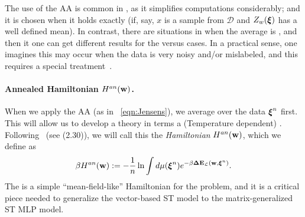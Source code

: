 The use of the AA is common in \STATMECH, as it simplifies computations considerably; and 
it is chosen when it holds exactly (if, say, $x$ is a \Typical sample from $\mathcal{D}$ and $Z_w(\boldsymbol{\xi})$ has a well defined mean).
In contrast, there are situations in \STATMECH when the average is \ATypical, and then it one can get different results for the \Quenched versus \Annealed cases.  In a practical sense, one imagines this may occur when the data is very
noisy and/or mislabeled, and this requires a special treatment~\cite{SST92}.

\paragraph{Annealed Hamiltonian $H^{an}({\mathbf{w}})$.}

When we apply the AA (as in \EQN~\ref{eqn:Jensens}), 
we average over the data $\boldsymbol{\xi}^{n}$ first. 
This will allow us to develop a theory in terms a (Temperature dependent) \EffectivePotential. 
%
Following~\cite{SST92} (see \EQN(2.30)), we will call this the \emph{\Annealed Hamiltonian} $H^{an}({\mathbf{w}})$, 
which we define as  %
  \begin{align}
   \label{eqn:Gan_def}
   \beta H^{an}({\mathbf{w}}):= - \frac{1}{n}\ln  \int d\mu(\boldsymbol{\xi}^{n})e^{-\beta\mathbf{\Delta {E}}_{\mathcal{L}}(\mathbf{w}, \boldsymbol{\xi}^{n})}.
  \end{align}
The \AnnealedHamiltonian is a simple ``mean-field-like'' Hamiltonian for the problem,
and it is a critical piece needed to generalize the vector-based ST \Perceptron model to the matrix-generalized ST MLP model.

